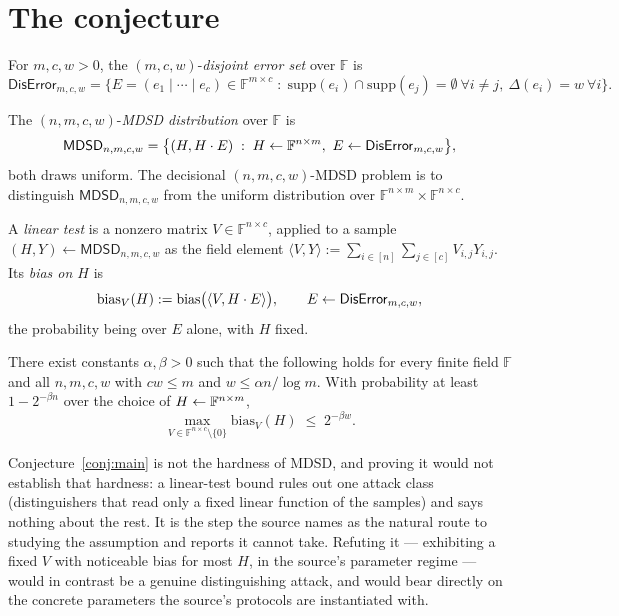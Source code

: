 \documentclass{aicr-conjecture}
\newcommand{\F}{\mathbb{F}}
\newcommand{\bias}{\mathrm{bias}}
\newcommand{\supp}{\mathrm{supp}}
\newcommand{\DisErr}{\mathsf{DisError}}
\newcommand{\MDSD}{\mathsf{MDSD}}
\begin{document}
\section{The conjecture}\label{sec:conjectures}

\begin{definition}\label{def:disjoint}
For $m, c, w > 0$, the $(m,c,w)$-\emph{disjoint error set} over $\F$ is
\[
  \DisErr_{m,c,w} = \bigl\{ E = (e_{1} \mid \cdots \mid e_{c}) \in
  \F^{m \times c} \;:\; \supp(e_{i}) \cap \supp(e_{j}) = \emptyset
  \ \forall i \ne j, \ \Delta(e_{i}) = w \ \forall i \bigr\}.
\]
\end{definition}

\begin{definition}\label{def:mdsd}
The $(n,m,c,w)$-\emph{MDSD distribution} over $\F$ is
\[
  \MDSD_{n,m,c,w} = \bigl\{ (H, H \cdot E) \;:\; H \sample \F^{n \times
  m}, \ E \sample \DisErr_{m,c,w} \bigr\},
\]
both draws uniform. The decisional $(n,m,c,w)$-MDSD problem is to
distinguish $\MDSD_{n,m,c,w}$ from the uniform distribution over
$\F^{n \times m} \times \F^{n \times c}$.
\end{definition}

\begin{definition}\label{def:lineartest}
A \emph{linear test} is a nonzero matrix $V \in \F^{n \times c}$, applied
to a sample $(H, Y) \leftarrow \MDSD_{n,m,c,w}$ as the field element
$\langle V, Y \rangle := \sum_{i \in [n]} \sum_{j \in [c]} V_{i,j}
Y_{i,j}$. Its \emph{bias on $H$} is
\[
  \bias_{V}(H) := \bias\bigl( \langle V, H \cdot E \rangle \bigr),
  \qquad E \sample \DisErr_{m,c,w},
\]
the probability being over $E$ alone, with $H$ fixed.
\end{definition}

\begin{conjecture}\label{conj:main}
There exist constants $\alpha, \beta > 0$ such that the following holds
for every finite field $\F$ and all $n, m, c, w$ with $cw \le m$ and
$w \le \alpha n / \log m$. With probability at least $1 - 2^{-\beta n}$
over the choice of $H \sample \F^{n \times m}$,
\[
  \max_{V \in \F^{n \times c} \setminus \{0\}} \bias_{V}(H)
  \;\le\; 2^{-\beta w}.
\]
\end{conjecture}

\begin{remark}
Conjecture~\ref{conj:main} is not the hardness of MDSD, and proving it
would not establish that hardness: a linear-test bound rules out one
attack class (distinguishers that read only a fixed linear function of
the samples) and says nothing about the rest. It is the step the source
names as the natural route to studying the assumption and reports it
cannot take. Refuting it --- exhibiting a fixed $V$ with noticeable bias
for most $H$, in the source's parameter regime --- would in contrast be
a genuine distinguishing attack, and would bear directly on the concrete
parameters the source's protocols are instantiated with.
\end{remark}
\end{document}
